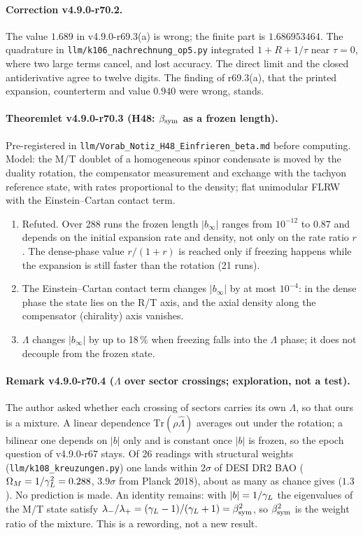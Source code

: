\paragraph{Correction v4.9.0-r70.2.}
The value \(1.689\) in v4.9.0-r69.3(a) is wrong; the finite part is \(1.686953464\).  The quadrature in \texttt{llm/k106\_nachrechnung\_op5.py}
integrated \(1+R+1/\tau\) near \(\tau=0\), where two large terms cancel, and lost accuracy.  The direct limit and the closed antiderivative agree
to twelve digits.  The finding of r69.3(a), that the printed expansion, counterterm and value \(0.940\) were wrong, stands.

\paragraph{Theoremlet v4.9.0-r70.3 (H48: \(\beta_{\mathrm{sym}}\) as a frozen length).}
Pre-registered in \texttt{llm/Vorab\_Notiz\_H48\_Einfrieren\_beta.md} before computing.  Model: the M/T doublet of a homogeneous spinor condensate
is moved by the duality rotation, the compensator measurement and exchange with the tachyon reference state, with rates proportional to the density;
flat unimodular FLRW with the Einstein--Cartan contact term.
\begin{enumerate}[leftmargin=2em]
\item[(a)] Refuted.  Over 288 runs the frozen length \(|b_\infty|\) ranges from \(10^{-12}\) to \(0.87\) and depends on the initial expansion rate and density,
not only on the rate ratio \(r\).  The dense-phase value \(r/(1+r)\) is reached only if freezing happens while the expansion is still faster than the
rotation (21 runs).
\item[(b)] The Einstein--Cartan contact term changes \(|b_\infty|\) by at most \(10^{-4}\): in the dense phase the state lies on the R/T axis, and the
axial density along the compensator (chirality) axis vanishes.
\item[(c)] \(\Lambda\) changes \(|b_\infty|\) by up to 18\,\% when freezing falls into the \(\Lambda\) phase; it does not decouple from the frozen state.
\end{enumerate}

\paragraph{Remark v4.9.0-r70.4 (\(\Lambda\) over sector crossings; exploration, not a test).}
The author asked whether each crossing of sectors carries its own \(\Lambda\), so that ours is a mixture.  A linear dependence \(\mathrm{Tr}(\rho\hat\Lambda)\)
averages out under the rotation; a bilinear one depends on \(|b|\) only and is constant once \(|b|\) is frozen, so the epoch question of v4.9.0-r67 stays.
Of 26 readings with structural weights (\texttt{llm/k108\_kreuzungen.py}) one lands within \(2\sigma\) of DESI DR2 BAO
(\(\Omega_M=1/\gamma_L^2=0.288\), \(3.9\sigma\) from Planck 2018), about as many as chance gives (\(1.3\)).  No prediction is made.  An identity remains:
with \(|b|=1/\gamma_L\) the eigenvalues of the M/T state satisfy \(\lambda_-/\lambda_+=(\gamma_L-1)/(\gamma_L+1)=\beta_{\mathrm{sym}}^2\), so \(\beta_{\mathrm{sym}}^2\) is the weight ratio of the
mixture.  This is a rewording, not a new result.

